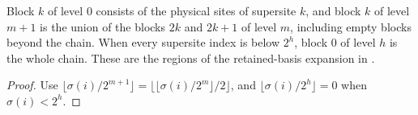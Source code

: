 \begin{lemma}
    \label{thm:hastings05_hierarchy_block}
    Block $k$ of level $0$ consists of the physical sites of supersite $k$,
    and block $k$ of level $m+1$ is the union of the blocks $2k$ and $2k+1$
    of level $m$, including empty blocks beyond the chain. When every
    supersite index is below $2^h$, block $0$ of level $h$ is the whole
    chain. These are the regions of the retained-basis expansion in
    \cite[Section~III]{Hastings2006Solving}.
\end{lemma}
\begin{proof}
    Use $\lfloor\sigma(i)/2^{m+1}\rfloor=\lfloor\lfloor\sigma(i)/2^m\rfloor/2\rfloor$,
    and $\lfloor\sigma(i)/2^h\rfloor=0$ when $\sigma(i)<2^h$.
\end{proof}
